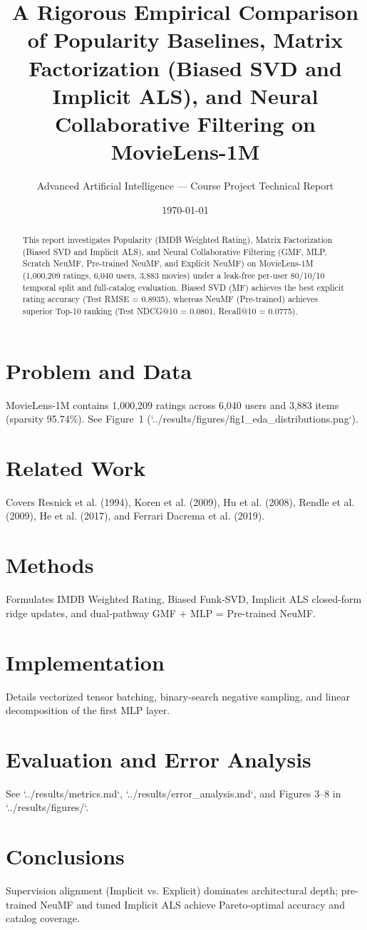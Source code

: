 \documentclass[11pt,a4paper]{article}
\title{\textbf{A Rigorous Empirical Comparison of Popularity Baselines, Matrix Factorization (Biased SVD and Implicit ALS), and Neural Collaborative Filtering on MovieLens-1M}}
\author{Advanced Artificial Intelligence --- Course Project Technical Report}
\date{\today}
\begin{document}
\maketitle
\begin{abstract}
This report investigates Popularity (IMDB Weighted Rating), Matrix Factorization (Biased SVD and Implicit ALS), and Neural Collaborative Filtering (GMF, MLP, Scratch NeuMF, Pre-trained NeuMF, and Explicit NeuMF) on MovieLens-1M (1,000,209 ratings, 6,040 users, 3,883 movies) under a leak-free per-user 80/10/10 temporal split and full-catalog evaluation. Biased SVD (MF) achieves the best explicit rating accuracy (Test RMSE = 0.8935), whereas NeuMF (Pre-trained) achieves superior Top-10 ranking (Test NDCG@10 = 0.0801, Recall@10 = 0.0775).
\end{abstract}
\section{Problem and Data}
MovieLens-1M contains 1,000,209 ratings across 6,040 users and 3,883 items (sparsity 95.74\%). See Figure~1 (`../results/figures/fig1_eda_distributions.png`).
\section{Related Work}
Covers Resnick et al. (1994), Koren et al. (2009), Hu et al. (2008), Rendle et al. (2009), He et al. (2017), and Ferrari Dacrema et al. (2019).
\section{Methods}
Formulates IMDB Weighted Rating, Biased Funk-SVD, Implicit ALS closed-form ridge updates, and dual-pathway GMF + MLP = Pre-trained NeuMF.
\section{Implementation}
Details vectorized tensor batching, binary-search negative sampling, and linear decomposition of the first MLP layer.
\section{Evaluation and Error Analysis}
See `../results/metrics.md`, `../results/error_analysis.md`, and Figures 3--8 in `../results/figures/`.
\section{Conclusions}
Supervision alignment (Implicit vs. Explicit) dominates architectural depth; pre-trained NeuMF and tuned Implicit ALS achieve Pareto-optimal accuracy and catalog coverage.
\end{document}
